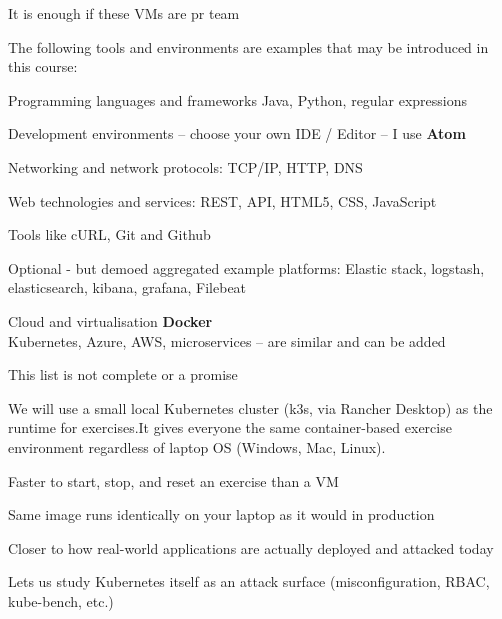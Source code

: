 \documentclass[Screen16to9,17pt]{foils}
\begin{document}
\centerline{It is enough if these VMs are pr team}



The following tools and environments are examples that may be introduced in this course:

\begin{list2}
\item Programming languages and frameworks Java, Python, regular expressions
\item Development environments -- choose your own IDE / Editor -- I use {\bf Atom}
\item Networking and network protocols: TCP/IP, HTTP, DNS
\item Web technologies and services: REST, API, HTML5, CSS, JavaScript
\item Tools like cURL, Git and Github
\item Optional - but demoed aggregated example platforms: Elastic stack, logstash, elasticsearch, kibana, grafana, Filebeat
\item Cloud and virtualisation {\bf Docker}\\
Kubernetes, Azure, AWS, microservices -- are similar and can be added
\end{list2}

\centerline{This list is not complete or a promise }




We will use a small local Kubernetes cluster (k3s, via Rancher Desktop) as the runtime for exercises.It gives everyone the same container-based exercise environment regardless of laptop OS (Windows, Mac, Linux).

\begin{list2}
  \item Faster to start, stop, and reset an exercise than a VM
  \item Same image runs identically on your laptop as it would in production
  \item Closer to how real-world applications are actually deployed and attacked today
  \item Lets us study Kubernetes itself as an attack surface (misconfiguration, RBAC, kube-bench, etc.)
\end{list2}
\end{document}
